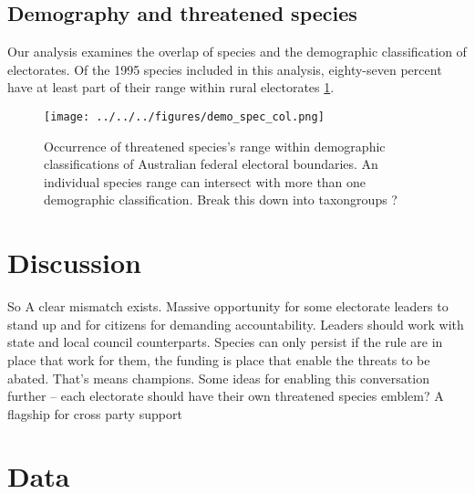 \documentclass[a4paper,11pt]{article}
\begin{document}
\subsection{Demography and threatened species}
Our analysis examines the overlap of species and the demographic classification of electorates. Of the 1995 species included in this analysis, eighty-seven percent have at least part of their range within rural electorates \ref{fig:demo}.

\begin{figure}[H]
	\centering
    \texttt{[image: ../../../figures/demo\_spec\_col.png]}
    \caption{Occurrence of threatened species's range within demographic classifications of Australian federal electoral boundaries. An individual species range can intersect with more than one demographic classification. Break this down into taxongroups ?}
    \label{fig:demo}
\end{figure}


\section{Discussion}

So A clear mismatch exists. 
Massive opportunity for some electorate leaders to stand up and for citizens for demanding accountability. 
Leaders should work with state and local council counterparts. 
Species can only persist if the rule are in place that work for them, the funding is place that enable the threats to be abated. That’s means champions. 
Some ideas for enabling this conversation further – each electorate should have their own threatened species emblem? A flagship for cross party support



\newpage
\section{Data}

\newpage
\nolinenumbers

\printbibliography
\end{document}
